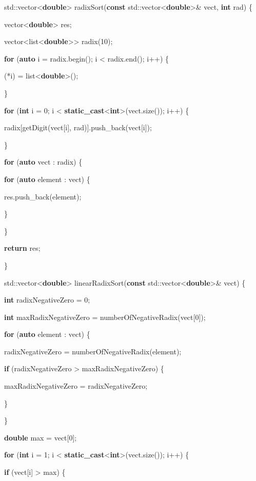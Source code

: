 \documentclass[]{article}
\begin{document}
std::vector\textless{}\textbf{double}\textgreater{}
radixSort(\textbf{const}
std::vector\textless{}\textbf{double}\textgreater{}\& vect, \textbf{int}
rad) \{

vector\textless{}\textbf{double}\textgreater{} res;

vector\textless{}list\textless{}\textbf{double}\textgreater{}\textgreater{}
radix(10);

\textbf{for} (\textbf{auto} i = radix.begin(); i \textless{}
radix.end(); i++) \{

(*i) = list\textless{}\textbf{double}\textgreater{}();

\}

\textbf{for} (\textbf{int} i = 0; i \textless{}
\textbf{static\_cast}\textless{}\textbf{int}\textgreater{}(vect.size());
i++) \{

radix{[}getDigit(vect{[}i{]}, rad){]}.push\_back(vect{[}i{]});

\}

\textbf{for} (\textbf{auto} vect : radix) \{

\textbf{for} (\textbf{auto} element : vect) \{

res.push\_back(element);

\}

\}

\textbf{return} res;

\}

std::vector\textless{}\textbf{double}\textgreater{}
linearRadixSort(\textbf{const}
std::vector\textless{}\textbf{double}\textgreater{}\& vect) \{

\textbf{int} radixNegativeZero = 0;

\textbf{int} maxRadixNegativeZero = numberOfNegativeRadix(vect{[}0{]});

\textbf{for} (\textbf{auto} element : vect) \{

radixNegativeZero = numberOfNegativeRadix(element);

\textbf{if} (radixNegativeZero \textgreater{} maxRadixNegativeZero) \{

maxRadixNegativeZero = radixNegativeZero;

\}

\}

\textbf{double} max = vect{[}0{]};

\textbf{for} (\textbf{int} i = 1; i \textless{}
\textbf{static\_cast}\textless{}\textbf{int}\textgreater{}(vect.size());
i++) \{

\textbf{if} (vect{[}i{]} \textgreater{} max) \{
\end{document}
